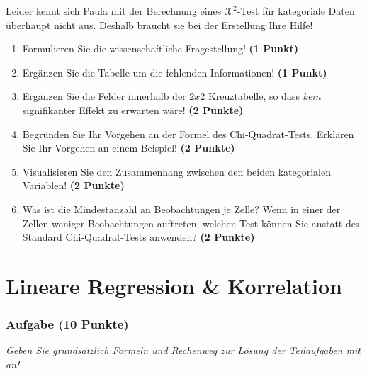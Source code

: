 \documentclass[a4paper, 9pt]{scrartcl}\usepackage[]{graphicx}\usepackage[]{xcolor}
\begin{document}
\vspace{5Ex}

Leider kennt sich Paula mit der Berechnung eines $\mathcal{X}^2$-Test für kategoriale Daten überhaupt nicht aus. Deshalb braucht sie bei der Erstellung Ihre Hilfe!

\begin{enumerate}
  \item Formulieren Sie die wissenschaftliche Fragestellung! \textbf{(1 Punkt)}
\item Ergänzen Sie die Tabelle um die fehlenden Informationen! \textbf{(1 Punkt)} 
\item Ergänzen Sie die Felder innerhalb der $2x2$ Kreuztabelle, so dass \textit{kein} signifikanter Effekt zu erwarten wäre! \textbf{(2 Punkte)}
\item Begründen Sie Ihr Vorgehen an der Formel des Chi-Quadrat-Tests. Erklären Sie Ihr Vorgehen an einem Beispiel! \textbf{(2 Punkte)}
\item Visualisieren Sie den Zusammenhang zwischen den beiden kategorialen Variablen! \textbf{(2 Punkte)}
\item Was ist die Mindestanzahl an Beobachtungen je Zelle? Wenn in einer der Zellen weniger Beobachtungen auftreten, welchen Test können Sie anstatt des Standard Chi-Quadrat-Tests anwenden? \textbf{(2 Punkte)}
\end{enumerate} 
\clearpage
\part{Lineare Regression \& Korrelation}

\section{Aufgabe \hfill (10 Punkte)}

\textit{Geben Sie grundsätzlich Formeln und Rechenweg zur Lösung der Teilaufgaben mit an!} \\[1Ex]
 
\end{document}
